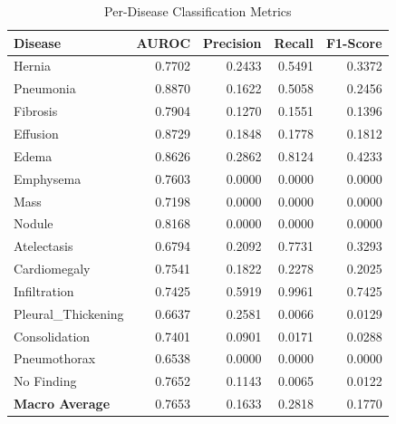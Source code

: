 \begin{table}[ht]
  \centering
  \caption{Per-Disease Classification Metrics}
  \label{tab:per_disease}
  \begin{tabular}{lrrrr}
    \toprule
    \textbf{Disease} & \textbf{AUROC} & \textbf{Precision} & \textbf{Recall} & \textbf{F1-Score} \\
    \midrule
  Hernia & 0.7702 & 0.2433 & 0.5491 & 0.3372 \\
  Pneumonia & 0.8870 & 0.1622 & 0.5058 & 0.2456 \\
  Fibrosis & 0.7904 & 0.1270 & 0.1551 & 0.1396 \\
  Effusion & 0.8729 & 0.1848 & 0.1778 & 0.1812 \\
  Edema & 0.8626 & 0.2862 & 0.8124 & 0.4233 \\
  Emphysema & 0.7603 & 0.0000 & 0.0000 & 0.0000 \\
  Mass & 0.7198 & 0.0000 & 0.0000 & 0.0000 \\
  Nodule & 0.8168 & 0.0000 & 0.0000 & 0.0000 \\
  Atelectasis & 0.6794 & 0.2092 & 0.7731 & 0.3293 \\
  Cardiomegaly & 0.7541 & 0.1822 & 0.2278 & 0.2025 \\
  Infiltration & 0.7425 & 0.5919 & 0.9961 & 0.7425 \\
  Pleural_Thickening & 0.6637 & 0.2581 & 0.0066 & 0.0129 \\
  Consolidation & 0.7401 & 0.0901 & 0.0171 & 0.0288 \\
  Pneumothorax & 0.6538 & 0.0000 & 0.0000 & 0.0000 \\
  No Finding & 0.7652 & 0.1143 & 0.0065 & 0.0122 \\
  \midrule
  \textbf{Macro Average} & 0.7653 & 0.1633 & 0.2818 & 0.1770 \\
    \bottomrule
  \end{tabular}
\end{table}